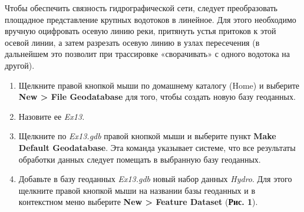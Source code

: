 \documentclass[]{book}
\theoremstyle{definition}
\theoremstyle{definition}
\theoremstyle{definition}
\theoremstyle{remark}
\begin{document}
Чтобы обеспечить связность гидрографической сети, следует преобразовать
площадное представление крупных водотоков в линейное. Для этого
необходимо вручную оцифровать осевую линию реки, притянуть устья
притоков к этой осевой линии, а затем разрезать осевую линию в узлах
пересечения (в дальнейшем это позволит при трассировке «сворачивать» с
одного водотока на другой).

\begin{enumerate}
\def\labelenumi{\arabic{enumi}.}
\item
  Щелкните правой кнопкой мыши по домашнему каталогу (Home) и выберите
  \textbf{New \textgreater{} File Geodatabase} для того, чтобы создать
  новую базу геоданных.
\item
  Назовите ее \emph{Ex13.}
\item
  Щелкните по \emph{Ex13.gdb} правой кнопкой мыши и выберите пункт
  \textbf{Make Default Geodatabase}. Эта команда указывает системе, что
  все результаты обработки данных следует помещать в выбранную базу
  геоданных.
\item
  Добавьте в базу геоданных \emph{Ex13.gdb} новый набор данных
  \emph{Hydro}. Для этого щелкните правой кнопкой мыши на названии базы
  геоданных и в контекстном меню выберите \textbf{New \textgreater{}
  Feature Dataset} (\textbf{Рис. 1}).


\end{enumerate}
\end{document}
